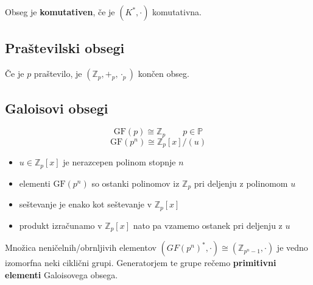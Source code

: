\begin{multicols}{5}
Obseg je \textbf{komutativen}, če je $(K^*, \cdot)$ komutativna.

\subsection*{Praštevilski obsegi}
Če je $p$ praštevilo, je $(\mathbb{Z}_p, +_p, \cdot_p)$ končen obseg.


\subsection*{Galoisovi obsegi}
\[\text{GF}(p) \cong \mathbb{Z}_p \qquad p \in \mathbb{P}\]
\[ \text{GF}(p^n) \cong \mathbb{Z}_p[x]/(u) \]
\begin{itemize}
	\item $u \in \mathbb{Z}_p[x]$ je nerazcepen polinom stopnje $n$
	\item elementi $\text{GF}(p^n)$ so ostanki polinomov iz $\mathbb{Z}_p$ pri deljenju z polinomom $u$
	\item seštevanje je enako kot seštevanje v $\mathbb{Z}_p[x]$
	\item produkt izračunamo v $\mathbb{Z}_p[x]$ nato pa vzamemo ostanek pri deljenju z $u$
\end{itemize}

Množica neničelnih/obrnljivih elementov $(GF(p^n)^*, \cdot) \cong (\mathbb{Z}_{p^n-1}, \cdot)$ je vedno izomorfna neki ciklični grupi.
Generatorjem te grupe rečemo \textbf{primitivni elementi} Galoisovega obsega.

\end{multicols}
